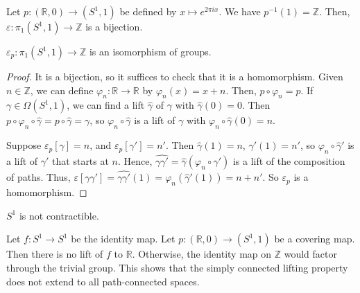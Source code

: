 \begin{example}
	Let \( p \colon (\mathbb R, 0) \to (S^1, 1) \) be defined by \( x \mapsto e^{2 \pi i x} \).
	We have \( p^{-1}(1) = \mathbb Z \).
	Then, \( \varepsilon \colon \pi_1(S^1, 1) \to \mathbb Z \) is a bijection.
\end{example}
\begin{theorem}
	\( \varepsilon_p \colon \pi_1(S^1, 1) \to \mathbb Z \) is an isomorphism of groups.
\end{theorem}
\begin{proof}
	It is a bijection, so it suffices to check that it is a homomorphism.
	Given \( n \in \mathbb Z \), we can define \( \varphi_n \colon \mathbb R \to \mathbb R \) by \( \varphi_n(x) = x + n \).
	Then, \( p \circ \varphi_n = p \).
	If \( \gamma \in \Omega(S^1, 1) \), we can find a lift \( \hat \gamma \) of \( \gamma \) with \( \hat \gamma(0) = 0 \).
	Then \( p \circ \varphi_n \circ \hat \gamma = p \circ \hat \gamma = \gamma \), so \( \varphi_n \circ \hat \gamma \) is a lift of \( \gamma \) with \( \varphi_n \circ \hat \gamma(0) = n \).

	Suppose \( \varepsilon_p[\gamma] = n \), and \( \varepsilon_p[\gamma'] = n' \).
	Then \( \hat\gamma(1) = n \), \( \hat\gamma'(1) = n' \), so \( \varphi_n \circ \hat \gamma' \) is a lift of \( \gamma' \) that starts at \( n \).
	Hence, \( \widehat{\gamma\gamma'} = \hat \gamma (\varphi_n \circ \hat \gamma') \) is a lift of the composition of paths.
	Thus, \( \varepsilon[\gamma\gamma'] = \widehat{\gamma\gamma'}(1) = \varphi_n(\hat\gamma'(1)) = n + n' \).
	So \( \varepsilon_p \) is a homomorphism.
\end{proof}
\begin{corollary}
	\( S^1 \) is not contractible.
\end{corollary}
\begin{example}
	Let \( f \colon S^1 \to S^1 \) be the identity map.
	Let \( p \colon (\mathbb R, 0) \to (S^1, 1) \) be a covering map.
	Then there is no lift of \( f \) to \( \mathbb R \).
	Otherwise, the identity map on \( \mathbb Z \) would factor through the trivial group.
	This shows that the simply connected lifting property does not extend to all path-connected spaces.
\end{example}

